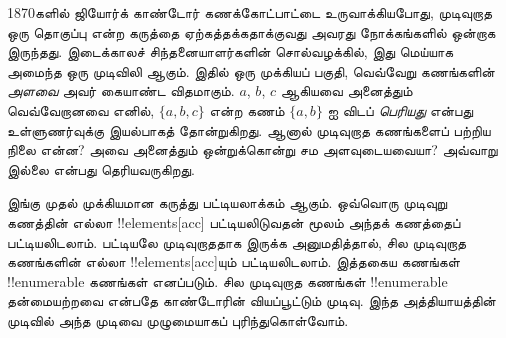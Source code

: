 \documentclass[../../../include/open-logic-section]{subfiles}
\begin{document}


1870களில் ஜியோர்க் காண்டோர் கணக்கோட்பாட்டை உருவாக்கியபோது,
முடிவுறாத ஒரு தொகுப்பு என்ற கருத்தை ஏற்கத்தக்கதாக்குவது
அவரது நோக்கங்களில் ஒன்றாக இருந்தது.
இடைக்காலச் சிந்தனையாளர்களின் சொல்வழக்கில், இது மெய்யாக அமைந்த
ஒரு முடிவிலி ஆகும். இதில் ஒரு முக்கியப் பகுதி,
வெவ்வேறு கணங்களின் \emph{அளவை} அவர் கையாண்ட விதமாகும்.
$a$, $b$, $c$ ஆகியவை அனைத்தும் வெவ்வேறானவை எனில்,
$\{a, b, c\}$ என்ற கணம் $\{a, b\}$ ஐ விடப்
\emph{பெரியது} என்பது உள்ளுணர்வுக்கு இயல்பாகத் தோன்றுகிறது.
ஆனால் முடிவுறாத கணங்களைப் பற்றிய நிலை என்ன?
அவை அனைத்தும் ஒன்றுக்கொன்று சம அளவுடையவையா?
அவ்வாறு இல்லை என்பது தெரியவருகிறது.

இங்கு முதல் முக்கியமான கருத்து பட்டியலாக்கம் ஆகும்.
ஒவ்வொரு முடிவுறு கணத்தின் எல்லா !!{element}s[acc] பட்டியலிடுவதன்
மூலம் அந்தக் கணத்தைப் பட்டியலிடலாம்.
பட்டியலே முடிவுறாததாக இருக்க அனுமதித்தால்,
சில முடிவுறாத கணங்களின் எல்லா !!{element}s[acc]யும்
பட்டியலிடலாம். இத்தகைய கணங்கள் !!{enumerable} கணங்கள் எனப்படும்.
சில முடிவுறாத கணங்கள் !!{enumerable} தன்மையற்றவை என்பதே
காண்டோரின் வியப்பூட்டும் முடிவு.
இந்த அத்தியாயத்தின் முடிவில் அந்த முடிவை முழுமையாகப் புரிந்துகொள்வோம்.
\end{document}
